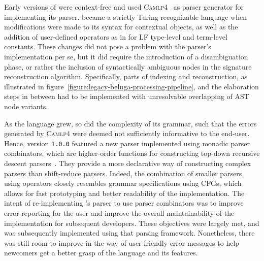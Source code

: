 Early versions of \Beluga were context-free and used \textsc{Camlp4}~\cite{de2003camlp4} as parser generator for implementing its parser.
\Beluga became a strictly Turing-recognizable language when modifications were made to its syntax for contextual objects, as well as the addition of user-defined operators as in \Twelf for \ac{LF} type-level and term-level constants.
These changes did not pose a problem with the parser's implementation per se, but it did require the introduction of a disambiguation phase, or rather the inclusion of syntactically ambiguous nodes in the signature reconstruction algorithm.
Specifically, parts of indexing and reconstruction, as illustrated in figure~\ref{figure:legacy-beluga-processing-pipeline}, and the elaboration steps in between had to be implemented with unresolvable overlapping of \ac{AST} node variants.


As the \Beluga language grew, so did the complexity of its grammar, such that the errors generated by \textsc{Camlp4} were deemed not sufficiently informative to the end-user.
Hence, \Beluga version \texttt{1.0.0} featured a new parser implemented using monadic parser combinators, which are higher-order functions for constructing top-down recursive descent parsers~\cite{Burge1975-BURRPT, hutton1996monadic, leijen2001parsec, generalparsercombs}.
They provide a more declarative way of constructing complex parsers than shift-reduce parsers.
Indeed, the combination of smaller parsers using operators closely resembles grammar specifications using \acp{CFG}, which allows for fast prototyping and better readability of the implementation.
The intent of re-implementing \Beluga's parser to use parser combinators was to improve error-reporting for the user and improve the overall maintainability of the implementation for subsequent developers.
These objectives were largely met, and \Harpoon was subsequently implemented using that parsing framework.
Nonetheless, there was still room to improve in the way of user-friendly error messages to help newcomers get a better grasp of the language and its features.



